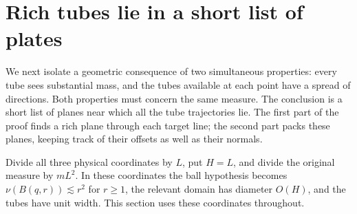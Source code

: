 \section{Rich tubes lie in a short list of plates}
\label{sec:geometry}

We next isolate a geometric consequence of two simultaneous properties:
every tube sees substantial mass, and the tubes available at each point
have a spread of directions. Both properties must concern the same
measure. The conclusion is a short list of planes near which all the
tube trajectories lie. The first part of the proof finds a rich plane
through each target line; the second part packs these planes, keeping
track of their offsets as well as their normals.

Divide all three physical coordinates by $L$, put $H=L$, and divide
the original measure by $mL^2$. In these coordinates the ball hypothesis
becomes $\nu(B(q,r))\lesssim r^2$ for $r\geq1$, the relevant domain
has diameter $O(H)$, and the tubes have unit width. This section uses
these coordinates throughout.


